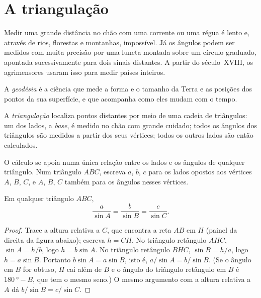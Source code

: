 \section{A triangulação}

Medir uma grande distância no chão com uma corrente ou uma régua é lento e,
através de rios, florestas e montanhas, impossível. Já os ângulos podem
ser medidos com muita precisão por uma luneta montada sobre um círculo
graduado, apontada sucessivamente para dois sinais distantes. A partir do
século~XVIII, os agrimensores usaram isso para medir países inteiros.

\begin{definition}[Geodésia]\label{def:g10:measuring-the-earth:geodesy}
A \emph{geodésia} é a ciência que mede a forma e
o tamanho da Terra e as posições dos pontos da sua superfície, e que
acompanha como eles mudam com o tempo.
\end{definition}

\begin{definition}[Triangulação]\label{def:g10:measuring-the-earth:triangulation}
A \emph{triangulação} localiza pontos
distantes por meio de uma cadeia de triângulos: um dos lados, a
\emph{base}, é medido no chão com grande cuidado; todos os ângulos dos
triângulos são medidos a partir dos seus vértices; todos os outros lados
são então calculados.
\end{definition}

O cálculo se apoia numa única relação entre os lados e os ângulos de
qualquer triângulo. Num triângulo $ABC$, escreva $a$, $b$, $c$ para os lados
opostos aos vértices $A$, $B$, $C$, e $A$, $B$, $C$ também para os ângulos
nesses vértices.

\begin{proposition}\label{prop:g10:measuring-the-earth:sine-rule}
Em qualquer triângulo $ABC$,
\[
  \frac{a}{\sin A} = \frac{b}{\sin B} = \frac{c}{\sin C}.
\]
\end{proposition}

\begin{proof}
Trace a altura relativa a $C$, que encontra a reta $AB$ em $H$ (painel da
direita da figura abaixo); escreva $h = CH$. No triângulo retângulo $AHC$,
$\sin A = h/b$, logo $h = b \sin A$. No triângulo retângulo $BHC$,
$\sin B = h/a$, logo $h = a \sin B$. Portanto $b \sin A = a \sin B$, isto
é, $a/\sin A = b/\sin B$. (Se o ângulo em $B$ for obtuso, $H$ cai além de
$B$ e o ângulo do triângulo retângulo em $B$ é $\qty{180}{\degree} - B$,
que tem o mesmo seno.) O mesmo argumento com a altura relativa a $A$ dá
$b/\sin B = c/\sin C$.
\end{proof}

